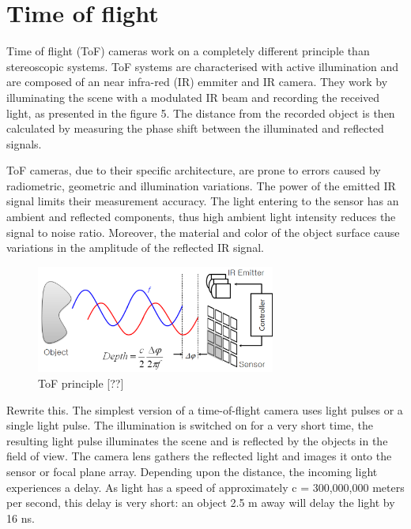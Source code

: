 \section{Time of flight}
\label{sec:tof}

Time of flight (ToF) cameras work on a completely different principle than stereoscopic systems. ToF systems are characterised with active illumination and are composed of an near infra-red (IR) emmiter and IR camera. They work by illuminating the scene with a modulated IR beam and recording the received light, as presented in the figure 5. The distance from the recorded object is then calculated by measuring the phase shift between the illuminated and reflected signals. 

ToF cameras, due to their specific architecture, are prone to errors caused by radiometric, geometric and illumination variations. The power of the emitted IR signal limits their measurement accuracy. The light entering to the sensor has an ambient and reflected components, thus high ambient light intensity reduces the signal to noise ratio. Moreover, the material and color of the object surface cause variations in the amplitude of the reflected IR signal.

\begin{figure}[H]
\label{fig:tof}
\centering
\includegraphics[width=0.7\textwidth]{fig/tofprinciple}
\caption{ToF principle [??]}
\end{figure}

Rewrite this. The simplest version of a time-of-flight camera uses light pulses or a single light pulse. The illumination is switched on for a very short time, the resulting light pulse illuminates the scene and is reflected by the objects in the field of view. The camera lens gathers the reflected light and images it onto the sensor or focal plane array. Depending upon the distance, the incoming light experiences a delay. As light has a speed of approximately c = 300,000,000 meters per second, this delay is very short: an object 2.5 m away will delay the light by 16 ns.

